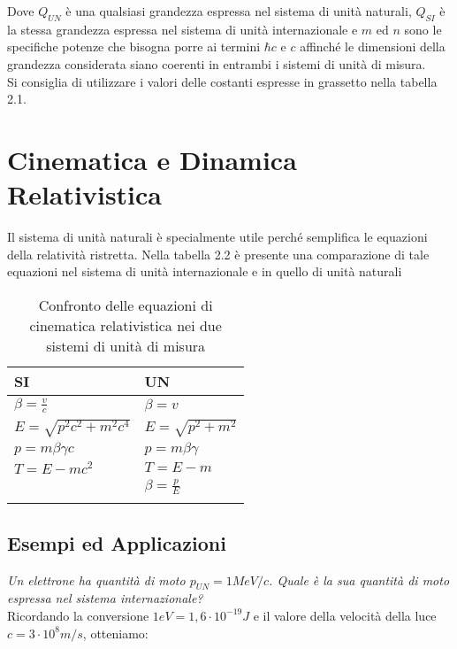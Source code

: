 Dove $Q_{UN}$ è una qualsiasi grandezza espressa nel sistema di unità naturali, $Q_{SI}$ è la stessa grandezza espressa nel sistema di unità internazionale e $m$ ed $n$ sono le specifiche potenze che bisogna porre ai termini $\hbar c$ e $c$ affinché le dimensioni della grandezza considerata siano coerenti in entrambi i sistemi di unità di misura.\\
Si consiglia di utilizzare i valori delle costanti espresse in grassetto nella tabella 2.1.\\

\section{Cinematica e Dinamica Relativistica}

Il sistema di unità naturali è specialmente utile perché semplifica le equazioni della relatività ristretta. Nella tabella 2.2 è presente una comparazione di tale equazioni nel sistema di unità internazionale e in quello di unità naturali

\begin{table}[]
\centering
\begin{tabular}{|l|l|}\hline
SI & UN \\ \hline
$\beta=\frac{v}{c}$   & $\beta=v$   \\ \hline
$E=\sqrt{p^2c^2+m^2c^4}$   &   $E=\sqrt{p^2+m^2}$ \\ \hline
$p=m\beta\gamma c$   &  $p=m\beta\gamma$  \\ \hline
$T=E-mc^2$   &  $T=E-m$  \\ \hline 
   &  $\beta=\frac{p}{E}$  \\ \hline
   &  \\ \hline
\end{tabular}
\label{equazioni}
\caption{Confronto delle equazioni di cinematica relativistica nei due sistemi di unità di misura}
\end{table}

\subsection{Esempi ed Applicazioni}

\emph{Un elettrone ha quantità di moto $p_{UN}=1 MeV/c$. Quale è la sua quantità di moto espressa nel sistema internazionale?}\\

Ricordando la conversione $1 eV=1,6\cdot10^{-19} J$ e il valore della velocità della luce $c=3\cdot 10^8 m/s$, otteniamo:

